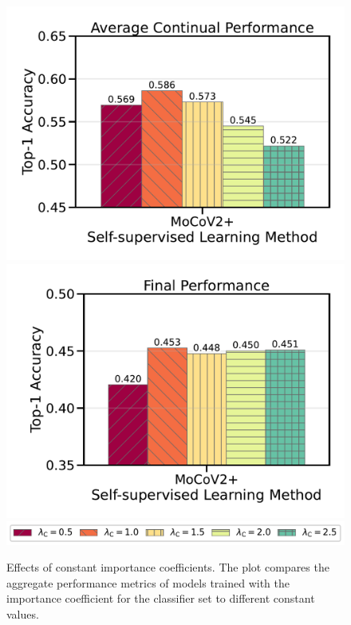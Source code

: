 \begin{figure}[t]
\begin{center}
   \includegraphics[width=0.49\linewidth]{figures_new/Part_2/F1-WISDM2019-6Tasks-Continual_Accuracy-v2.pdf}
   \includegraphics[width=0.49\linewidth]{figures_new/Part_2/F1-WISDM2019-6Tasks-Final_Accuracy-v2.pdf} \\
   \vspace{-0.05in}
   \includegraphics[width=0.8\linewidth]{figures_new/Part_2/F1-WISDM2019-6Tasks-v2_legend.pdf}
\end{center}
\vspace{-0.15in}
   \caption{Effects of constant importance coefficients. The plot compares the aggregate performance metrics of models trained with the importance coefficient for the classifier set to different constant values.}
    \vspace{-0.2in}
   \label{fig:kaizen_general_performance_constant_lamb}
\end{figure}

